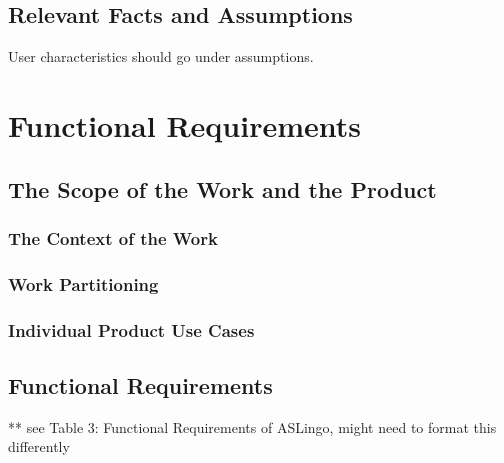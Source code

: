 \documentclass[12pt, titlepage]{article}
\begin{document}
\subsection{Relevant Facts and Assumptions}

User characteristics should go under assumptions.

\section{Functional Requirements}

\subsection{The Scope of the Work and the Product}

\subsubsection{The Context of the Work}

\subsubsection{Work Partitioning}

\subsubsection{Individual Product Use Cases}

\subsection{Functional Requirements}
 
** see Table 3: Functional Requirements of ASLingo, might need to format this differently \\
\end{document}
